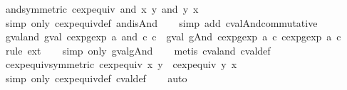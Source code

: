 \begin{isabellebody}
{\isafoldproof}%
%
\isadelimproof
\isanewline
%
\endisadelimproof
\isanewline
{}\isamarkupfalse%
\ and{\isacharunderscore}symmetric{\isacharcolon}\ {\isachardoublequoteopen}cexp{\isacharunderscore}equiv\ {\isacharparenleft}and\ x\ y{\isacharparenright}\ {\isacharparenleft}and\ y\ x{\isacharparenright}{\isachardoublequoteclose}\isanewline
%
\isadelimproof
\ \ %
\endisadelimproof
%
\isatagproof
{}\isamarkupfalse%
\ {\isacharparenleft}simp\ only{\isacharcolon}\ cexp{\isacharunderscore}equiv{\isacharunderscore}def\ and{\isacharunderscore}is{\isacharunderscore}And{\isacharparenright}\isanewline
\ \ \isamarkupfalse%
\ {\isacharparenleft}simp\ add{\isacharcolon}\ cval{\isacharunderscore}And{\isacharunderscore}commutative{\isacharparenright}%
\endisatagproof
{\isafoldproof}%
%
\isadelimproof
\isanewline
%
\endisadelimproof
\isanewline
{}\isamarkupfalse%
\ gval{\isacharunderscore}and{\isacharcolon}\ {\isachardoublequoteopen}gval\ {\isacharparenleft}cexp{}gexp\ a\ {\isacharparenleft}and\ c{}\ c{}{\isacharparenright}{\isacharparenright}\ {\isacharequal}\ gval\ {\isacharparenleft}gAnd\ {\isacharparenleft}cexp{}gexp\ a\ c{}{\isacharparenright}\ {\isacharparenleft}cexp{}gexp\ a\ c{}{\isacharparenright}{\isacharparenright}{\isachardoublequoteclose}\isanewline
%
\isadelimproof
\ \ %
\endisadelimproof
%
\isatagproof
{}\isamarkupfalse%
\ {\isacharparenleft}rule\ ext{\isacharparenright}\isanewline
\ \ \isamarkupfalse%
\ {\isacharparenleft}simp\ only{\isacharcolon}\ gval{\isacharunderscore}gAnd{\isacharparenright}\isanewline
\ \ \isamarkupfalse%
\ {\isacharparenleft}metis\ cval{\isacharunderscore}and\ cval{\isacharunderscore}def{\isacharparenright}%
\endisatagproof
{\isafoldproof}%
%
\isadelimproof
\isanewline
%
\endisadelimproof
\isanewline
{}\isamarkupfalse%
\ cexp{\isacharunderscore}equiv{\isacharunderscore}symmetric{\isacharcolon}\ {\isachardoublequoteopen}cexp{\isacharunderscore}equiv\ x\ y\ {\isacharequal}\ cexp{\isacharunderscore}equiv\ y\ x{\isachardoublequoteclose}\isanewline
%
\isadelimproof
\ \ %
\endisadelimproof
%
\isatagproof
{}\isamarkupfalse%
\ {\isacharparenleft}simp\ only{\isacharcolon}\ cexp{\isacharunderscore}equiv{\isacharunderscore}def\ cval{\isacharunderscore}def{\isacharparenright}\isanewline
\ \ \isamarkupfalse%
\ auto%
\endisatagproof
{\isafoldproof}%
%
\isadelimproof
\isanewline
%
\endisadelimproof
\isanewline

\end{isabellebody}
